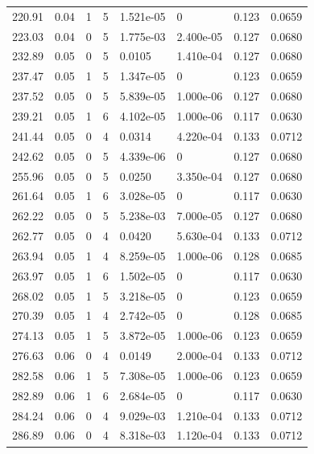 \documentclass[preview]{standalone}
\begin{document}
{{{\begin{tabular}{L{1.2cm}C{1.2cm} C{0.3cm}C{0.5cm} C{1.4cm}C{1.4cm} C{1.4cm}C{1.4cm}}
  220.91  &  0.04  & 1     &  5 &  1.521e-05  & 0  & 0.123 &  0.0659   \\ 
  223.03  &  0.04  & 0     &  5 &  1.775e-03  & 2.400e-05  & 0.127 &  0.0680   \\ 
  232.89  &  0.05  & 0     &  5 &  0.0105  & 1.410e-04  & 0.127 &  0.0680   \\ 
  237.47  &  0.05  & 1     &  5 &  1.347e-05  & 0  & 0.123 &  0.0659   \\ 
  237.52  &  0.05  & 0     &  5 &  5.839e-05  & 1.000e-06  & 0.127 &  0.0680   \\ 
  239.21  &  0.05  & 1     &  6 &  4.102e-05  & 1.000e-06  & 0.117 &  0.0630   \\ 
  241.44  &  0.05  & 0     &  4 &  0.0314  & 4.220e-04  & 0.133 &  0.0712   \\ 
  242.62  &  0.05  & 0     &  5 &  4.339e-06  & 0  & 0.127 &  0.0680   \\ 
  255.96  &  0.05  & 0     &  5 &  0.0250  & 3.350e-04  & 0.127 &  0.0680   \\ 
  261.64  &  0.05  & 1     &  6 &  3.028e-05  & 0  & 0.117 &  0.0630   \\ 
  262.22  &  0.05  & 0     &  5 &  5.238e-03  & 7.000e-05  & 0.127 &  0.0680   \\ 
  262.77  &  0.05  & 0     &  4 &  0.0420  & 5.630e-04  & 0.133 &  0.0712   \\ 
  263.94  &  0.05  & 1     &  4 &  8.259e-05  & 1.000e-06  & 0.128 &  0.0685   \\ 
  263.97  &  0.05  & 1     &  6 &  1.502e-05  & 0  & 0.117 &  0.0630   \\ 
  268.02  &  0.05  & 1     &  5 &  3.218e-05  & 0  & 0.123 &  0.0659   \\ 
  270.39  &  0.05  & 1     &  4 &  2.742e-05  & 0  & 0.128 &  0.0685   \\ 
  274.13  &  0.05  & 1     &  5 &  3.872e-05  & 1.000e-06  & 0.123 &  0.0659   \\ 
  276.63  &  0.06  & 0     &  4 &  0.0149  & 2.000e-04  & 0.133 &  0.0712   \\ 
  282.58  &  0.06  & 1     &  5 &  7.308e-05  & 1.000e-06  & 0.123 &  0.0659   \\ 
  282.89  &  0.06  & 1     &  6 &  2.684e-05  & 0  & 0.117 &  0.0630   \\ 
  284.24  &  0.06  & 0     &  4 &  9.029e-03  & 1.210e-04  & 0.133 &  0.0712   \\ 
  286.89  &  0.06  & 0     &  4 &  8.318e-03  & 1.120e-04  & 0.133 &  0.0712   \\ 

\end{tabular}}}}
\end{document}
